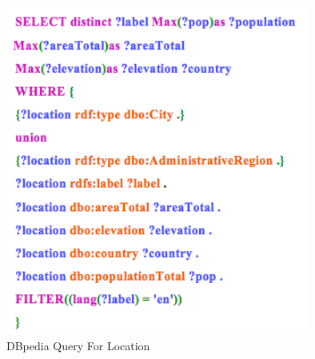 \begin{figure}[H]
	\begin{center}
	\includegraphics[width=10cm]{DB_Loc}
	\caption[DBpedia Query For Location]{DBpedia Query For Location}
	\label{fig:db}
	\end{center}
\end{figure}




